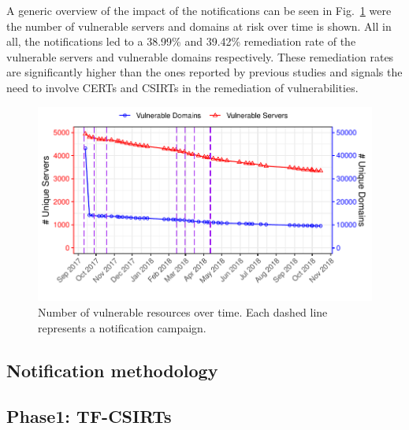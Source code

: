 A generic overview of the impact of the notifications can be seen in Fig.~\ref{fig:ts_notif} were the number of vulnerable servers and domains at risk over time is shown.
All in all, the notifications led to a 38.99\% and 39.42\%
remediation rate of the vulnerable servers and vulnerable domains respectively. These remediation rates are significantly higher than the ones reported by previous studies and signals the need to involve CERTs and CSIRTs in the remediation of vulnerabilities.  

\begin{figure}[!hbt]
    \centering
    \includegraphics[width=\columnwidth]{figs/ts_notif.pdf}
    \caption{Number of vulnerable resources over time. Each dashed line represents a notification campaign.}
    \label{fig:ts_notif}
\end{figure}

\subsection{Notification methodology}



\subsection{Phase1: TF-CSIRTs}

